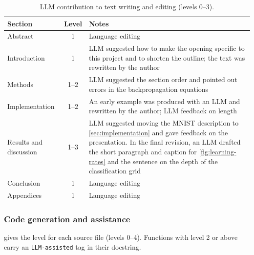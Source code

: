 \begin{table}[htbp]
    \centering
    \caption{LLM contribution to text writing and editing (levels 0--3).}
    \label{tab:llm-writing-contribution}
    {\footnotesize
    \begin{tabularx}{\columnwidth}{@{}lcX@{}}
        \toprule
        \textbf{Section} & \textbf{Level} & \textbf{Notes} \\
        \midrule
        Abstract & 1 & Language editing \\
        Introduction & 1 & LLM suggested how to make the opening specific to this project and
        to shorten the outline; the text was rewritten by the author \\
        Methods & 1--2 & LLM suggested the section order and pointed out errors in the
        backpropagation equations \\
        Implementation & 1--2 & An early example was produced with an LLM and rewritten by the
        author; LLM feedback on length \\
        Results and discussion & 1--3 & LLM suggested moving the MNIST description to
        \cref{sec:implementation} and gave feedback on the presentation. In the final revision, an LLM drafted the short
        paragraph and caption for \cref{fig:learning-rates} and the sentence on the depth of the
        classification grid \\
        Conclusion & 1 & Language editing \\
        Appendices & 1 & Language editing \\
        \bottomrule
    \end{tabularx}}
\end{table}

\subsubsection{Code generation and assistance}
 gives the level for each source file (levels 0--4).
Functions with level 2 or above carry an \texttt{LLM-assisted} tag in their
docstring.

